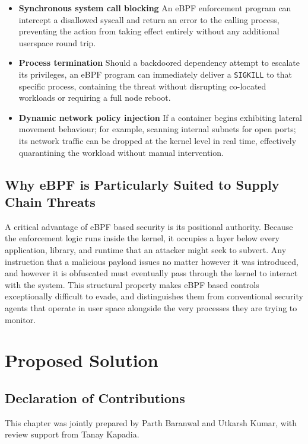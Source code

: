 \begin{itemize}[leftmargin=1.5em]
    \item \textbf{Synchronous system call blocking} An eBPF enforcement program can intercept a disallowed syscall and return an error to the calling process, preventing the action from taking effect entirely without any additional userspace round trip.
 
    \item \textbf{Process termination} Should a backdoored dependency attempt to escalate its privileges, an eBPF program can immediately deliver a \texttt{SIGKILL} to that specific process, containing the threat without disrupting co-located workloads or requiring a full node reboot.
 
    \item \textbf{Dynamic network policy injection} If a container begins exhibiting lateral movement behaviour; for example, scanning internal subnets for open ports; its network traffic can be dropped at the kernel level in real time, effectively quarantining the workload without manual intervention.
\end{itemize}
 
\section{Why eBPF is Particularly Suited to Supply Chain Threats}
 
A critical advantage of eBPF based security is its positional authority. Because the enforcement logic runs inside the kernel, it occupies a layer below every application, library, and runtime that an attacker might seek to subvert. Any instruction that a malicious payload issues no matter however it was introduced, and however it is obfuscated must eventually pass through the kernel to interact with the system. This structural property makes eBPF based controls exceptionally difficult to evade, and distinguishes them from conventional security agents that operate in user space alongside the very processes they are trying to monitor.


\chapter{Proposed Solution}
\label{ch:proposed-solution}

\section*{Declaration of Contributions}
This chapter was jointly prepared by Parth Baranwal and Utkarsh Kumar, with review support from Tanay Kapadia.

